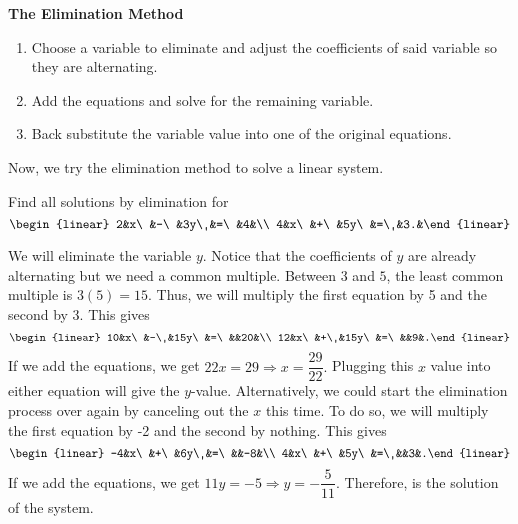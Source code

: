 \textbf{The Elimination Method}
\begin{enumerate}[label=\arabic*., ref=\arabic*]
\item Choose a variable to eliminate and adjust the coefficients of said variable so they are alternating.
\item Add the equations and solve for the remaining variable.
\item Back substitute the variable value into one of the original equations.
\end{enumerate}\vs

Now, we try the elimination method to solve a linear system.\\



\begin{AppExam} Find all solutions by elimination for \[\begin{linear} 2&x\ &-\ &3y\ &=\  &4&\\ 4&x\ &+\ &5y\  &=\ &3.&\end{linear}\]

We will eliminate the variable $y$. Notice that the coefficients of $y$ are already alternating but we need a common multiple. Between $3$ and $5$, the least common multiple is $3(5) = 15$. Thus, we will multiply the first equation by 5 and the second by 3. This gives
\[\begin{linear} 10&x\ &-\ &15y\ &=\  &&20&\\ 12&x\ &+\ &15y\  &=\ &&9&.\end{linear}\]\vs If we add the equations, we get $22x = 29 \Rightarrow x = \dfrac{29}{22}.$ Plugging this $x$ value into either equation will give the $y$-value. Alternatively, we could start the elimination process over again by  canceling out the $x$ this time. To do so, we will multiply the first equation by -2 and the second by nothing. This gives
\[\begin{linear} -4&x\ &+\ &6y\ &=\  &&-8&\\ 4&x\ &+\ &5y\  &=\ &&3&.\end{linear}\]\vs If we add the equations, we get $11y = -5 \Rightarrow y = -\dfrac{5}{11}.$
 Therefore,  is the solution of the system. 
\end{AppExam}\vs

